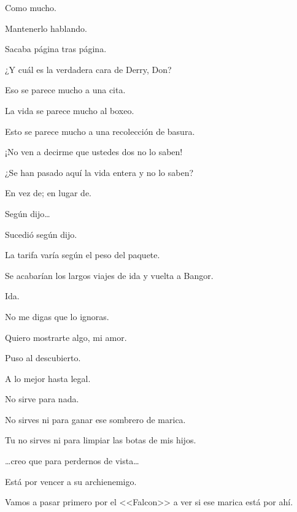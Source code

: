 \sk
Como mucho. 

\sk
Mantenerlo hablando. 

\sk
Sacaba página tras página. 

\sk
¿Y cuál es la verdadera cara de Derry, Don? \nb{}

\sk
Eso se parece mucho a una cita. 

\sk
La vida se parece mucho al boxeo. 

\sk
Esto se parece mucho a una recolección de basura. 

\sk
¡No ven a decirme que ustedes dos no lo saben! \nb{}

\sk
¿Se han pasado aquí la vida entera y no lo saben? \nb{}

\sk
En vez de; en lugar de. 

\sk
Según dijo\ldots{} 

\sk
Sucedió según dijo. 

\sk
La tarifa varía según el peso del paquete. 

\sk
Se acabarían los largos viajes de ida y vuelta a Bangor. 

\sk
Ida. 

\sk
No me digas que lo ignoras. 

\sk
Quiero mostrarte algo, mi amor. \nb{}

\sk
Puso al descubierto. 

\sk
A lo mejor hasta legal. 

\sk
No sirve para nada. 

\sk
No sirves ni para ganar ese sombrero de marica. \nb{}

\sk
Tu no sirves ni para limpiar las botas de mis hijos. 

\sk
\ldots{}creo que para perdernos de vista\ldots{} 

\sk
Está por vencer a su archienemigo. 

\sk
Vamos a pasar primero por el <<Falcon>> a ver si ese marica está por ahí. \nb{}

